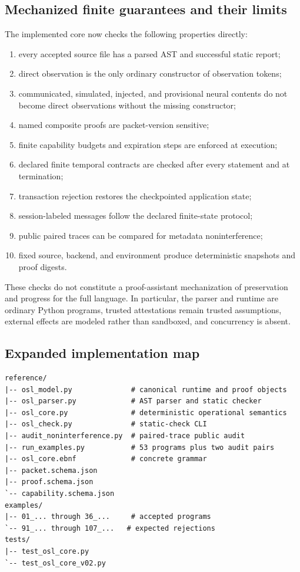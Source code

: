 \subsection{Mechanized finite guarantees and their limits}

The implemented core now checks the following properties directly:
\begin{enumerate}[leftmargin=1.7em]
  \item every accepted source file has a parsed AST and successful static report;
  \item direct observation is the only ordinary constructor of observation tokens;
  \item communicated, simulated, injected, and provisional neural contents do
  not become direct observations without the missing constructor;
  \item named composite proofs are packet-version sensitive;
  \item finite capability budgets and expiration steps are enforced at execution;
  \item declared finite temporal contracts are checked after every statement and
  at termination;
  \item transaction rejection restores the checkpointed application state;
  \item session-labeled messages follow the declared finite-state protocol;
  \item public paired traces can be compared for metadata noninterference;
  \item fixed source, backend, and environment produce deterministic snapshots
  and proof digests.
\end{enumerate}

These checks do not constitute a proof-assistant mechanization of preservation
and progress for the full language.  In particular, the parser and runtime are
ordinary Python programs, trusted attestations remain trusted assumptions,
external effects are modeled rather than sandboxed, and concurrency is absent.

\subsection{Expanded implementation map}

\begin{verbatim}
reference/
|-- osl_model.py              # canonical runtime and proof objects
|-- osl_parser.py             # AST parser and static checker
|-- osl_core.py               # deterministic operational semantics
|-- osl_check.py              # static-check CLI
|-- audit_noninterference.py  # paired-trace public audit
|-- run_examples.py           # 53 programs plus two audit pairs
|-- osl_core.ebnf             # concrete grammar
|-- packet.schema.json
|-- proof.schema.json
`-- capability.schema.json
examples/
|-- 01_... through 36_...     # accepted programs
`-- 91_... through 107_...   # expected rejections
tests/
|-- test_osl_core.py
`-- test_osl_core_v02.py
\end{verbatim}

